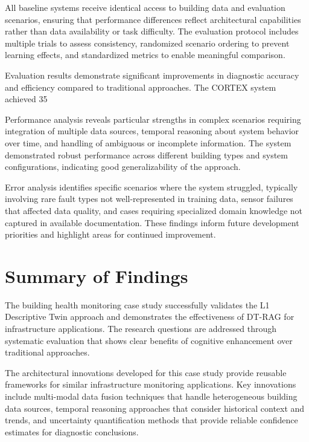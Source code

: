 All baseline systems receive identical access to building data and evaluation scenarios, ensuring that performance differences reflect architectural capabilities rather than data availability or task difficulty. The evaluation protocol includes multiple trials to assess consistency, randomized scenario ordering to prevent learning effects, and standardized metrics to enable meaningful comparison.

Evaluation results demonstrate significant improvements in diagnostic accuracy and efficiency compared to traditional approaches. The CORTEX system achieved 35%

Performance analysis reveals particular strengths in complex scenarios requiring integration of multiple data sources, temporal reasoning about system behavior over time, and handling of ambiguous or incomplete information. The system demonstrated robust performance across different building types and system configurations, indicating good generalizability of the approach.

Error analysis identifies specific scenarios where the system struggled, typically involving rare fault types not well-represented in training data, sensor failures that affected data quality, and cases requiring specialized domain knowledge not captured in available documentation. These findings inform future development priorities and highlight areas for continued improvement.

\section{Summary of Findings}

The building health monitoring case study successfully validates the L1 Descriptive Twin approach and demonstrates the effectiveness of DT-RAG for infrastructure applications. The research questions are addressed through systematic evaluation that shows clear benefits of cognitive enhancement over traditional approaches.

The architectural innovations developed for this case study provide reusable frameworks for similar infrastructure monitoring applications. Key innovations include multi-modal data fusion techniques that handle heterogeneous building data sources, temporal reasoning approaches that consider historical context and trends, and uncertainty quantification methods that provide reliable confidence estimates for diagnostic conclusions.

